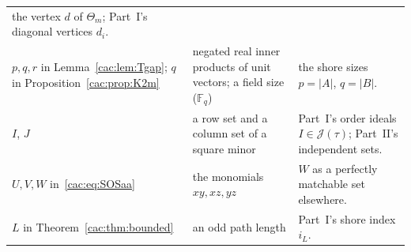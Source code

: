 \documentclass[11pt]{article}
\numberwithin{equation}{section}
\theoremstyle{definition}
\newcommand{\J}{\mathcal J(\tau)}
\newcommand{\F}{\mathbb F}
\begin{document}
\begin{table}[htbp]
\begin{tabularx}{\textwidth}{@{}>{\raggedright}p{}>{\raggedright}p{}Y@{}}
 the vertex $d$ of $\Theta_m$; Part~I's diagonal vertices $d_i$.\\
$p,q,r$ in Lemma~\ref{cac:lem:Tgap}; $q$ in
 Proposition~\ref{cac:prop:K2m} & negated real inner products of unit
 vectors; a field size ($\F_q$) & the shore sizes $p=|A|$, $q=|B|$.\\
$I$, $J$ & a row set and a column set of a square minor & Part~I's order
 ideals $I\in\J$; Part~II's independent sets.\\
$U,V,W$ in~\eqref{cac:eq:SOSaa} & the monomials $xy,xz,yz$ & $W$ as a
 perfectly matchable set elsewhere.\\
$L$ in Theorem~\ref{cac:thm:bounded} & an odd path length & Part~I's shore
 index $i_L$.\\
\bottomrule
\end{tabularx}
\end{table}
\end{document}
